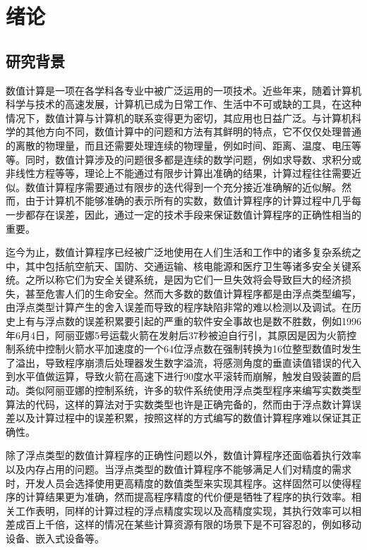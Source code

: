 \chapter{绪论}\label{chapter_introduction}

\section{研究背景}

数值计算\cite{rburden81:numerical}是一项在各学科各专业中被广泛运用的一项技术。近些年来，随着计算机科学与技术的高速发展，计算机已成为日常工作、生活中不可或缺的工具，在这种情况下，数值计算与计算机的联系变得更为密切，其应用也日益广泛。与计算机科学的其他方向不同，数值计算中的问题和方法有其鲜明的特点，它不仅仅处理普通的离散的物理量，而且还需要处理连续的物理量，例如时间、距离、温度、电压等等。同时，数值计算涉及的问题很多都是连续的数学问题，例如求导数、求积分或非线性方程等等，理论上不能通过有限步计算出准确的结果，计算过程往往需要近似。数值计算程序需要通过有限步的迭代得到一个充分接近准确解的近似解。然而，由于计算机不能够准确的表示所有的实数，数值计算程序的计算过程中几乎每一步都存在误差，因此，通过一定的技术手段来保证数值计算程序的正确性相当的重要。

迄今为止，数值计算程序已经被广泛地使用在人们生活和工作中的诸多复杂系统之中，其中包括航空航天、国防、交通运输、核电能源和医疗卫生等诸多安全关键系统。之所以称它们为安全关键系统，是因为它们一旦失效将会导致巨大的经济损失，甚至危害人们的生命安全。然而大多数的数值计算程序都是由浮点类型编写，由浮点类型计算产生的舍入误差而导致的程序缺陷非常的难以检测以及调试。在历史上有与浮点数的误差积累要引起的严重的软件安全事故也是数不胜数，例如1996年6月4日，阿丽亚娜5号运载火箭在发射后37秒被迫自行引\cite{lions1996ariane}，其原因是因为火箭控制系统中控制火箭水平加速度的一个64位浮点数在强制转换为16位整型数值时发生了溢出，导致程序崩溃后处理器发生数字溢流，将感测角度的垂直读值错误的代入到水平值做运算，导致火箭在高速下进行90度水平滚转而崩解，触发自毁装置的启动。类似阿丽亚娜的控制系统，许多的软件系统使用浮点类型程序来编写实数类型算法的代码，这样的算法对于实数类型也许是正确完备的，然而由于浮点数计算误差以及计算过程中的误差积累，按照这样的方式编写的数值计算程序难以保证其正确性。

除了浮点类型的数值计算程序的正确性问题以外，数值计算程序还面临着执行效率以及内存占用的问题。当浮点类型的数值计算程序不能够满足人们对精度的需求时，开发人员会选择使用更高精度的数值类型来实现其程序。这样固然可以使得程序的计算结果更为准确，然而提高程序精度的代价便是牺牲了程序的执行效率。相关工作表明，同样的计算过程的浮点精度实现以及高精度实现，其执行效率可以相差成百上千倍，这样的情况在某些计算资源有限的场景下是不可容忍的，例如移动设备、嵌入式设备等。

